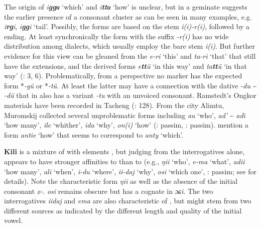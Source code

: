 The origin of \textit{i}\textbf{\textit{gg}}\textit{ʉ} ‘which’ and \textit{i}\textbf{\textit{tt}}\textit{ʉ} ‘how’ is unclear, but in  a geminate suggests the earlier presence of a consonant cluster as can be seen in many examples, e.g.  \textit{i}\textbf{\textit{rg}}\textit{i},  \textit{i}\textbf{\textit{gg}}\textit{i} ‘tail’. Possibly, the forms are based on the stem \textit{i(i)-r(i)}, followed by a  ending. At least synchronically the form with the suffix \textit{-r(i)} has no wide distribution among  dialects, which usually employ the bare stem \textit{i(i)}. But further evidence for this view can be gleaned from the  \textit{e-ri} ‘this’ and \textit{ta-ri} ‘that’ that still have the extensions, and the derived forms \textit{e}\textbf{\textit{tt}}\textit{ü} ‘in this way’ and \textit{ta}\textbf{\textit{tt}}\textit{ü} ‘in that way’ (\citealt{Tsumagari2009a}: 3, 6). Problematically, from a  perspective no  marker has the expected form *\textit{-gü} or *\textit{-tü}. At least the latter may have a connection with the dative \textit{-du} {\textasciitilde} \textit{-dü} that in  also has a variant \textit{-tu} with an unvoiced consonant. Ramstedt’s Ongkor  materials have been recorded in Tacheng (\citealt{Lie1978}: 128). From the city Alimtu, Muromskij collected several unproblematic forms including \textit{au} ‘who’, \textit{ad’} {\textasciitilde} \textit{ad\~\i} ‘how many’, \textit{ile} ‘whither’, \textit{ida} ‘why’, \textit{on(i)} ‘how’ (\citealt{Lie1978}: passim, \citealt{Kałużyński1971}: passim). \citet[63]{ChaokeKajia2014} mention a form \textit{antie} ‘how’ that seems to correspond to  \textit{anty} ‘which’.

\textbf{Kili} is a mixture of  with  elements \citep{Doerfer1978a}, but judging from the interrogatives alone,  appears to have stronger affinities to  than to  (e.g., \textit{ŋii} ‘who’, \textit{e-ma} ‘what’, \textit{adii} ‘how many’, \textit{ali} ‘when’, \textit{i-du} ‘where’, \textit{ii-daj} ‘why’, \textit{osi} ‘which one’, \citealt{Kazama2003}: passim; see \citealt{Sunik1958} for details). Note the characteristic form \textit{ŋii} as well as the absence of the initial consonant \textit{x-}.  \textit{osi} remains obscure but has a cognate in  \textit{ɔɕi}. The two interrogatives \textit{iidaj} and \textit{ema} are also characteristic of , but might stem from two different sources as indicated by the different length and quality of the initial vowel.

